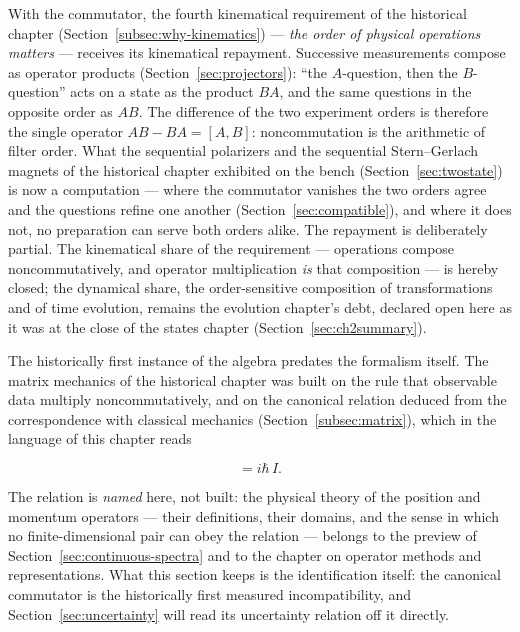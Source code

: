 With the commutator, the fourth kinematical requirement of the historical chapter (Section~\ref{subsec:why-kinematics}) --- \emph{the order of physical operations matters} --- receives its kinematical repayment. Successive measurements compose as operator products (Section~\ref{sec:projectors}): ``the $A$-question, then the $B$-question'' acts on a state as the product $BA$, and the same questions in the opposite order as $AB$. The difference of the two experiment orders is therefore the single operator $AB - BA = [A,B]$: noncommutation is the arithmetic of filter order. What the sequential polarizers and the sequential Stern--Gerlach magnets of the historical chapter exhibited on the bench (Section~\ref{sec:twostate}) is now a computation --- where the commutator vanishes the two orders agree and the questions refine one another (Section~\ref{sec:compatible}), and where it does not, no preparation can serve both orders alike. The repayment is deliberately partial. The kinematical share of the requirement --- operations compose noncommutatively, and operator multiplication \emph{is} that composition --- is hereby closed; the dynamical share, the order-sensitive composition of transformations and of time evolution, remains the evolution chapter's debt, declared open here as it was at the close of the states chapter (Section~\ref{sec:ch2summary}).

The historically first instance of the algebra predates the formalism itself. The matrix mechanics of the historical chapter was built on the rule that observable data multiply noncommutatively, and on the canonical relation deduced from the correspondence with classical mechanics (Section~\ref{subsec:matrix}), which in the language of this chapter reads
\begin{linenomath}
    \begin{equation}
        [Q,P] = i\hbar\,I .
        \label{eq:canonical-commutator}
    \end{equation}
\end{linenomath}
The relation is \emph{named} here, not built: the physical theory of the position and momentum operators --- their definitions, their domains, and the sense in which no finite-dimensional pair can obey the relation --- belongs to the preview of Section~\ref{sec:continuous-spectra} and to the chapter on operator methods and representations. What this section keeps is the identification itself: the canonical commutator is the historically first measured incompatibility, and Section~\ref{sec:uncertainty} will read its uncertainty relation off it directly.

